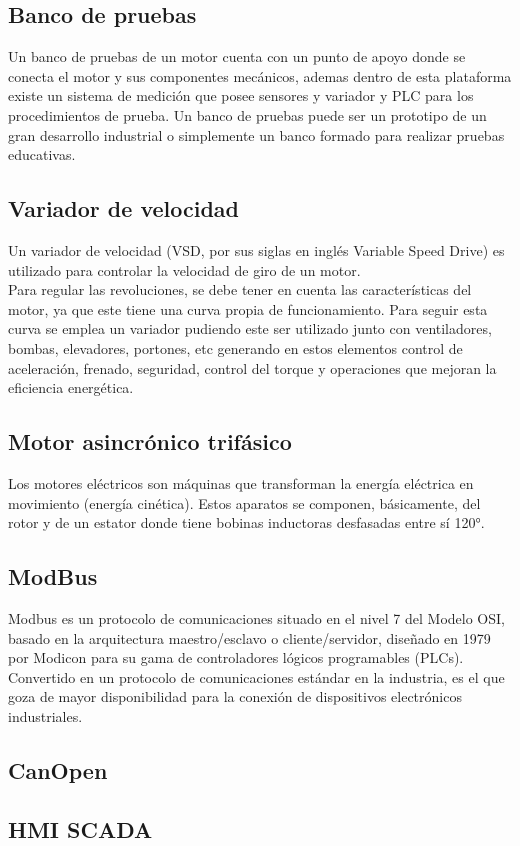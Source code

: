 \subsection{Banco de pruebas}

Un banco de pruebas de un motor cuenta con un punto de apoyo donde se conecta el motor y sus componentes mecánicos, ademas dentro de esta plataforma existe un sistema de medición que posee sensores y variador y PLC para los procedimientos de prueba.
Un banco de pruebas puede ser un prototipo de un gran desarrollo industrial o simplemente un banco formado para realizar pruebas educativas. 


\subsection{Variador de velocidad}
Un variador de velocidad (VSD, por sus siglas en inglés Variable Speed Drive) es utilizado para controlar la velocidad de giro de un motor. \\
Para regular las revoluciones, se debe tener en cuenta las características del motor, ya que este tiene una curva propia de funcionamiento. Para seguir esta curva se emplea un variador pudiendo este ser utilizado junto con ventiladores, bombas, elevadores, portones, etc generando en estos elementos control de aceleración, frenado, seguridad, control del torque y operaciones que mejoran la eficiencia energética.

\subsection{Motor asincrónico trifásico}
Los motores eléctricos son máquinas que transforman la energía eléctrica en
movimiento (energía cinética). Estos aparatos se componen, básicamente, del rotor y de un estator donde tiene bobinas inductoras desfasadas entre sí 120°.

\subsection{ModBus}
Modbus es un protocolo de comunicaciones situado en el nivel 7 del Modelo OSI, basado en la arquitectura maestro/esclavo o cliente/servidor, diseñado en 1979 por Modicon para su gama de controladores lógicos programables (PLCs). Convertido en un protocolo de comunicaciones estándar en la industria, es el que goza de mayor disponibilidad para la conexión de dispositivos electrónicos industriales.

\subsection{CanOpen}

\subsection{HMI SCADA}